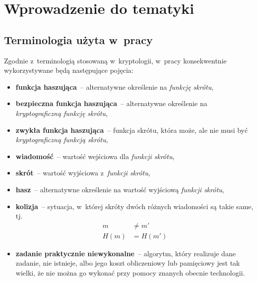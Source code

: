 \section{Wprowadzenie do tematyki}



\subsection{Terminologia użyta w~pracy}
Zgodnie z~terminologią stosowaną w~kryptologii, w~pracy konsekwentnie
wykorzystywane będą następujące pojęcia:

\begin{itemize}

    \item \textbf{funkcja haszująca}~-- alternatywne określenie na
    \emph{funkcję skrótu},

    \item \textbf{bezpieczna funkcja haszująca}~-- alternatywne określenie na
    \emph{kryptograficzną funkcję skrótu},

    \item \textbf{zwykła funkcja haszująca}~-- funkcja skrótu, która może, ale
    nie musi być \emph{kryptograficzną funkcją skrótu},

    \item \textbf{wiadomość}~-- wartość wejściowa dla \emph{funkcji skrótu},

    \item \textbf{skrót}~-- wartość wyjściowa z~\emph{funkcji skrótu},

    \item \textbf{hasz}~-- alternatywne określenie na wartość wyjściową
    \emph{funkcji skrótu},

    \item \textbf{kolizja}~-- sytuacja, w~której skróty dwóch różnych
    wiadomości są takie same, tj.
    \[
        \begin{aligned}
        m &\neq m' \\
        H(m) &= H(m')
        \end{aligned}
    \]

    \item \textbf{zadanie praktycznie niewykonalne}~-- algorytm, który
    realizuje dane zadanie, nie istnieje, albo jego koszt obliczeniowy lub
    pamięciowy jest tak wielki, że nie można go wykonać przy pomocy znanych
    obecnie technologii.

\end{itemize}

